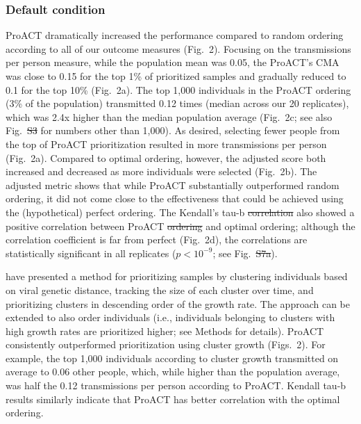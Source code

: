 \documentclass[a4paper,11pt]{article}
\newcommand{\authorcite}[1]{\citeauthor{#1}\supercite{#1}}
\newcommand{\TODO}[1]{{\color{red} #1} }
\newcommand{\PLWH}{sample\xspace}
\providecommand{\DIFadd}[1]{{\protect\color{blue}\uwave{#1}}} %
\providecommand{\DIFdel}[1]{{\protect\color{red}\sout{#1}}}                      %
\providecommand{\DIFaddbegin}{} %
\providecommand{\DIFaddend}{} %
\providecommand{\DIFdelbegin}{} %
\providecommand{\DIFdelend}{} %
\begin{document}
\subsubsection{Default condition}
ProACT dramatically increased the performance compared to random ordering according to all of our outcome measures (Fig.~2).
Focusing on the transmissions per person measure, while the population mean was 0.05, the ProACT's CMA was close to 0.15 for the top 1\% of prioritized \PLWH{s} and gradually reduced to 0.1 for the top 10\% (Fig.~2a).
The top 1,000 individuals in the ProACT ordering (3\% of the population)  transmitted {0.12} times (median across our 20 replicates), which was 2.4x  higher than the median population average (Fig.~2c; see also Fig.~\DIFdelbegin \DIFdel{S3 }\DIFdelend \DIFaddbegin \DIFadd{S5 }\DIFaddend for numbers other than 1,000).
As desired, selecting fewer people from the top of ProACT prioritization resulted in more transmissions per person (Fig.~2a).
Compared to optimal ordering, however, the adjusted score both increased and decreased as more individuals were selected (Fig.~2b). 
The adjusted metric shows that while ProACT substantially outperformed random ordering, it did not come close to the effectiveness that could be achieved using the (hypothetical) perfect ordering. 
The Kendall's tau-b \DIFdelbegin \DIFdel{correlation }\DIFdelend also showed a positive correlation between ProACT \DIFdelbegin \DIFdel{ordering }\DIFdelend and optimal ordering;  although the correlation coefficient is far from perfect (Fig.~2d), the correlations are statistically significant in all replicates ($p<10^{-9}$; see Fig.~\DIFdelbegin \DIFdel{S7a}\DIFdelend \DIFaddbegin \DIFadd{S6}\DIFaddend ).




\authorcite{Wertheim2018} have presented a method for prioritizing \PLWH{s} by clustering individuals based on viral genetic distance, tracking the size of each cluster over time, and prioritizing clusters in descending order of the growth rate. The approach can be extended to also order individuals (i.e., individuals belonging to clusters with high growth rates are prioritized higher; see Methods for details).
ProACT consistently outperformed prioritization using cluster growth  (Figs.~2).
For example, the top 1,000 individuals according to cluster growth transmitted on average to 0.06 other people, which, while higher than the population average, was half the 0.12 transmissions per person according to ProACT. 
Kendall tau-b results similarly indicate that ProACT has better correlation with the optimal ordering.
\end{document}
